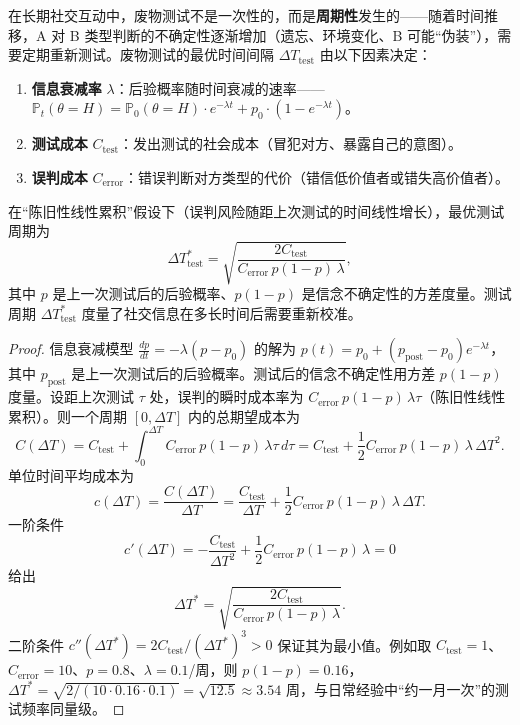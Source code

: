 \begin{proposition}[废物测试的周期性与序贯决策]\label{prop:shittest_periodic}
在长期社交互动中，废物测试不是一次性的，而是\textbf{周期性}发生的——随着时间推移，A 对 B 类型判断的不确定性逐渐增加（遗忘、环境变化、B 可能“伪装”），需要定期重新测试。废物测试的最优时间间隔 $\Delta T_{\text{test}}$ 由以下因素决定：
\begin{enumerate}[label=(\roman*)]
    \item \textbf{信息衰减率} $\lambda$：后验概率随时间衰减的速率——$\mathbb{P}_t(\theta = H) = \mathbb{P}_0(\theta = H) \cdot e^{-\lambda t} + p_0 \cdot (1 - e^{-\lambda t})$。
    \item \textbf{测试成本} $C_{\text{test}}$：发出测试的社会成本（冒犯对方、暴露自己的意图）。
    \item \textbf{误判成本} $C_{\text{error}}$：错误判断对方类型的代价（错信低价值者或错失高价值者）。
\end{enumerate}
在“陈旧性线性累积”假设下（误判风险随距上次测试的时间线性增长），最优测试周期为
\[
\Delta T_{\text{test}}^* = \sqrt{\frac{2 C_{\text{test}}}{C_{\text{error}}\, p(1-p)\, \lambda}},
\]
其中 $p$ 是上一次测试后的后验概率、$p(1-p)$ 是信念不确定性的方差度量。测试周期 $\Delta T_{\text{test}}^*$ 度量了社交信息在多长时间后需要重新校准。
\end{proposition}

\begin{proof}
信息衰减模型 $\frac{dp}{dt} = -\lambda(p-p_0)$ 的解为 $p(t) = p_0 + (p_{\text{post}}-p_0)e^{-\lambda t}$，其中 $p_{\text{post}}$ 是上一次测试后的后验概率。测试后的信念不确定性用方差 $p(1-p)$ 度量。设距上次测试 $\tau$ 处，误判的瞬时成本率为 $C_{\text{error}}\,p(1-p)\,\lambda\tau$（陈旧性线性累积）。则一个周期 $[0,\Delta T]$ 内的总期望成本为
\[
C(\Delta T) = C_{\text{test}} + \int_0^{\Delta T} C_{\text{error}}\,p(1-p)\,\lambda\tau\,d\tau
= C_{\text{test}} + \frac12 C_{\text{error}}\,p(1-p)\,\lambda\,\Delta T^2.
\]
单位时间平均成本为
\[
c(\Delta T) = \frac{C(\Delta T)}{\Delta T} = \frac{C_{\text{test}}}{\Delta T} + \frac12 C_{\text{error}}\,p(1-p)\,\lambda\,\Delta T.
\]
一阶条件
\[
c'(\Delta T) = -\frac{C_{\text{test}}}{\Delta T^2} + \frac12 C_{\text{error}}\,p(1-p)\,\lambda = 0
\]
给出
\[
\Delta T^* = \sqrt{\frac{2C_{\text{test}}}{C_{\text{error}}\,p(1-p)\,\lambda}}.
\]
二阶条件 $c''(\Delta T^*) = 2C_{\text{test}}/(\Delta T^*)^3 > 0$ 保证其为最小值。例如取 $C_{\text{test}}=1$、$C_{\text{error}}=10$、$p=0.8$、$\lambda = 0.1$/周，则 $p(1-p)=0.16$，$\Delta T^* = \sqrt{2/(10\cdot 0.16\cdot 0.1)} = \sqrt{12.5} \approx 3.54$ 周，与日常经验中“约一月一次”的测试频率同量级。
\end{proof}


